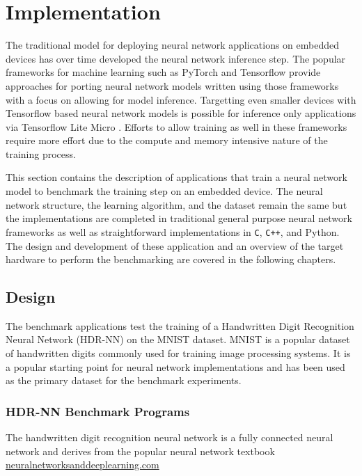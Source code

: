 \part{Implementation}

The traditional model for deploying neural network applications on embedded devices has over time developed the neural network inference step. The popular frameworks for machine learning such as PyTorch and Tensorflow provide approaches for porting neural network models written using those frameworks with a focus on allowing for model inference. Targetting even smaller devices with Tensorflow based neural network models is possible for inference only applications via Tensorflow Lite Micro \cite{tflm}. Efforts to allow training as well in these frameworks require more effort due to the compute and memory intensive nature of the training process.

This section contains the description of applications that train a neural network model to benchmark the training step on an embedded device. The neural network structure, the learning algorithm, and the dataset remain the same but the implementations are completed in traditional general purpose neural network frameworks as well as straightforward implementations in \texttt{C}, \texttt{C++}, and Python. The design and development of these application and an overview of the target hardware to perform the benchmarking are covered in the following chapters.


\chapter{Design}

The benchmark applications test the training of a Handwritten Digit Recognition Neural Network (HDR-NN) on the MNIST \cite{mnist} dataset. MNIST is a popular dataset of handwritten digits commonly used for training image processing systems. It is a popular starting point for neural network implementations and has been used as the primary dataset for the benchmark experiments.

\section[Handwritten Digit Recognition (HDR)]{HDR-NN Benchmark Programs}

The handwritten digit recognition neural network is a fully connected neural network and derives from the popular neural network textbook \href{http://neuralnetworksanddeeplearning.com}{neuralnetworksanddeeplearning.com}

